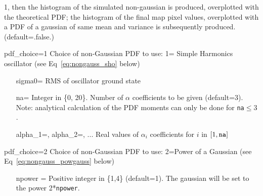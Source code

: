 \begin{qualifiers}
\begin{qulistwide}{}
1, then the histogram of the simulated non-gaussian is produced, overplotted
with the theoretical PDF; the histogram of the final map pixel values,
overplotted with a PDF of a gaussian of same mean and variance is subsequently
produced.
(default=.false.)
%
     \item[{pdf\_choice=1}] Choice of non-Gaussian PDF to use: 1= Simple
Harmonics oscillator (see Eq~\ref{eq:nongauss_sho} below)
%
    \begin{itemize}
      \item[{sigma0= }] RMS of oscillator ground state
%
      \item[{na= }] Integer in \{0, 20\}. Number of $\alpha$ coefficients to be
given (default=3).
Note: analytical calculation of the PDF moments
can only be done for {\tt na}$\le 3$. 
%
      \item[{alpha\_1=, alpha\_2=, ... }] Real values of $\alpha_i$ coefficients for
$i$ in $[1, {\tt na}]$
     \end{itemize}
%
     \item[{pdf\_choice=2}] Choice of non-Gaussian PDF to use: 2=Power of a
Gaussian (see Eq~\ref{eq:nongauss_powgauss} below)
      \begin{itemize}
     \item[{npower = }] Positive integer in \{1,4\} (default=1). The gaussian
will be set to the power 2*{\tt npower}.
     \end{itemize}
%
  \end{qulistwide}
\end{qualifiers}
\newpage

